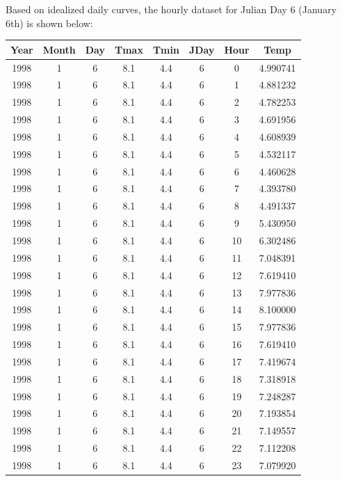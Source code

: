 \documentclass[
]{article}
\begin{document}
Based on idealized daily curves, the hourly dataset for Julian Day 6 (January 6th) is shown below:

\begingroup\fontsize{15}{17}\selectfont

\begin{tabular}{c|c|c|c|c|c|c|c}
\hline
Year & Month & Day & Tmax & Tmin & JDay & Hour & Temp\\
\hline
1998 & 1 & 6 & 8.1 & 4.4 & 6 & 0 & 4.990741\\
\hline
1998 & 1 & 6 & 8.1 & 4.4 & 6 & 1 & 4.881232\\
\hline
1998 & 1 & 6 & 8.1 & 4.4 & 6 & 2 & 4.782253\\
\hline
1998 & 1 & 6 & 8.1 & 4.4 & 6 & 3 & 4.691956\\
\hline
1998 & 1 & 6 & 8.1 & 4.4 & 6 & 4 & 4.608939\\
\hline
1998 & 1 & 6 & 8.1 & 4.4 & 6 & 5 & 4.532117\\
\hline
1998 & 1 & 6 & 8.1 & 4.4 & 6 & 6 & 4.460628\\
\hline
1998 & 1 & 6 & 8.1 & 4.4 & 6 & 7 & 4.393780\\
\hline
1998 & 1 & 6 & 8.1 & 4.4 & 6 & 8 & 4.491337\\
\hline
1998 & 1 & 6 & 8.1 & 4.4 & 6 & 9 & 5.430950\\
\hline
1998 & 1 & 6 & 8.1 & 4.4 & 6 & 10 & 6.302486\\
\hline
1998 & 1 & 6 & 8.1 & 4.4 & 6 & 11 & 7.048391\\
\hline
1998 & 1 & 6 & 8.1 & 4.4 & 6 & 12 & 7.619410\\
\hline
1998 & 1 & 6 & 8.1 & 4.4 & 6 & 13 & 7.977836\\
\hline
1998 & 1 & 6 & 8.1 & 4.4 & 6 & 14 & 8.100000\\
\hline
1998 & 1 & 6 & 8.1 & 4.4 & 6 & 15 & 7.977836\\
\hline
1998 & 1 & 6 & 8.1 & 4.4 & 6 & 16 & 7.619410\\
\hline
1998 & 1 & 6 & 8.1 & 4.4 & 6 & 17 & 7.419674\\
\hline
1998 & 1 & 6 & 8.1 & 4.4 & 6 & 18 & 7.318918\\
\hline
1998 & 1 & 6 & 8.1 & 4.4 & 6 & 19 & 7.248287\\
\hline
1998 & 1 & 6 & 8.1 & 4.4 & 6 & 20 & 7.193854\\
\hline
1998 & 1 & 6 & 8.1 & 4.4 & 6 & 21 & 7.149557\\
\hline
1998 & 1 & 6 & 8.1 & 4.4 & 6 & 22 & 7.112208\\
\hline
1998 & 1 & 6 & 8.1 & 4.4 & 6 & 23 & 7.079920\\
\hline
\end{tabular}
\endgroup{}
\end{document}
